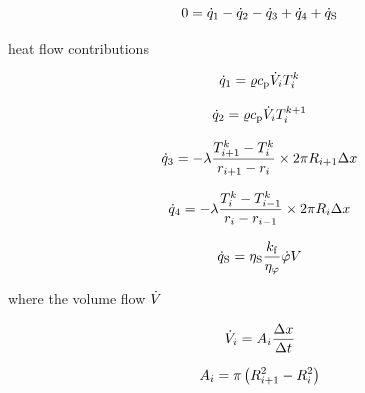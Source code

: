 \documentclass{scrartcl}
\begin{document}
    \begin{equation}
        0 = {\dot{q}}_1 - {\dot{q}}_2 - {\dot{q}}_3 + {\dot{q}}_4 + {\dot{q}_\mathrm{S}}
        \label{eq:heat_flow_balance}
    \end{equation}

    heat flow contributions

    \begin{equation}
        {\dot{q}}_1 = {\varrho} {c_\mathrm{p}} {\dot{V}}_{i} {T}_{{i}}^{{k}}
        \label{eq:heat_flow_1}
    \end{equation}

    \begin{equation}
        {\dot{q}}_2 = {\varrho} {c_\mathrm{p}} {\dot{V}}_{i} {T}_{{i}}^{{k}+1}
        \label{eq:heat_flow_2}
    \end{equation}

    \begin{equation}
        {\dot{q}}_3 = -{\lambda} \frac{{T}_{{i}+1}^{{k}}-{T}_{{i}}^{{k}}}{{r}_{{i}+1} - {r}_{{i}}} \times 2 \pi {R}_{{i}+1} {\Delta x}
        \label{eq:heat_flow_3}
    \end{equation}

    \begin{equation}
        {\dot{q}}_4 = -{\lambda} \frac{{T}_{{i}}^{{k}}-{T}_{{i}-1}^{{k}}}{{r}_{{i}} - {r}_{{i} - 1}} \times 2 \pi {R}_{{i}} {\Delta x}
        \label{eq:heat_flow_4}
    \end{equation}

    \begin{equation}
        {\dot{q}_\mathrm{S}} = {\eta_\mathrm{S}} \frac{{k_\mathrm{f}}}{{\eta_\varphi}} {\dot{\varphi}} {V}
        \label{eq:heat_source}
    \end{equation}

    where the volume flow ${\dot{V}}$

    \begin{equation}
        {\dot{V}}_{i} = {A}_{{i}} \frac{{\Delta x}}{{\Delta t}}
        \label{eq:volume_flow}
    \end{equation}

    \begin{equation}
        {A}_{{i}} = \pi \left( {R}_{{i}+1}^2 -  {R}_{{i}}^2 \right)
        \label{eq:cross_section}
    \end{equation}
\end{document}
